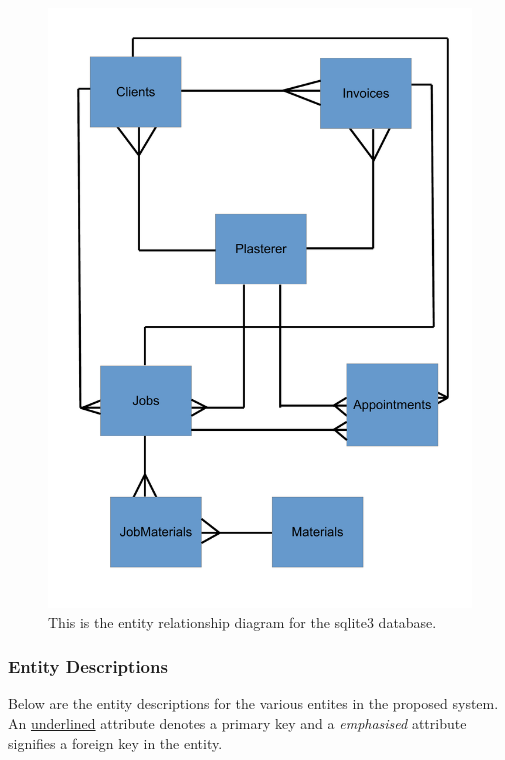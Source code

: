 \begin{figure}[H]
    \includegraphics[scale=0.4]{./Design/images/ERDiagram.pdf}
    \caption{This is the entity relationship diagram for the sqlite3 database.} \label{fig:Entity_Relationship_Diagram}
\end{figure}


\pagebreak
\subsubsection{Entity Descriptions}

\begin{flushleft}

Below are the entity descriptions for the various entites in the proposed system. An \underline{underlined} attribute denotes a primary key and a \emph{emphasised}	attribute signifies a foreign key in the entity.

\end{flushleft}




